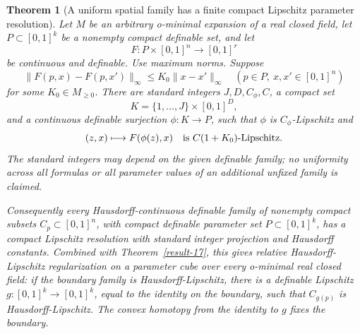 \documentclass[11pt,a4paper]{article}
\newtheorem{theorem}{Theorem}[section]
\theoremstyle{definition}
\begin{document}
\begin{theorem}[A uniform spatial family has a finite compact Lipschitz parameter resolution]\label{result-18}
Let \(M\) be an arbitrary o-minimal expansion of a real closed field, let
\(P\subset[0,1]^k\) be a nonempty compact definable set, and let
\[
 F:P\times[0,1]^n\longrightarrow[0,1]^r
\]
be continuous and definable. Use maximum norms. Suppose
\begin{equation}
 \|F(p,x)-F(p,x')\|_\infty\le K_0\|x-x'\|_\infty
 \quad(p\in P,\ x,x'\in[0,1]^n)
 \label{equation-39}
\end{equation}
for some \(K_0\in M_{\ge0}\). There are standard integers
\(J,D,C_\phi,C\), a compact set
\[
 K=\{1,\ldots,J\}\times[0,1]^D,
\]
and a continuous definable surjection \(\phi:K\to P\), such that
\(\phi\) is \(C_\phi\)-Lipschitz and
\begin{equation}
 (z,x)\longmapsto F(\phi(z),x)
 \quad\hbox{is }C(1+K_0)\hbox{-Lipschitz}.
 \label{equation-40}
\end{equation}
The standard integers may depend on the given definable family; no
uniformity across all formulas or all parameter values of an additional
unfixed family is claimed.

Consequently every Hausdorff-continuous definable family of nonempty
compact subsets \(C_p\subset[0,1]^n\), with compact definable parameter
set \(P\subset[0,1]^k\), has a compact Lipschitz resolution with standard
integer projection and Hausdorff constants. Combined with Theorem~\ref{result-17}, this
gives relative Hausdorff-Lipschitz regularization on a parameter cube
over every o-minimal real closed field: if the boundary family is
Hausdorff-Lipschitz, there is a definable Lipschitz \(g:[0,1]^k\to[0,1]^k\),
equal to the identity on the boundary, such that \(C_{g(p)}\) is
Hausdorff-Lipschitz. The convex homotopy from the identity to \(g\) fixes
the boundary.
\end{theorem}
\end{document}

